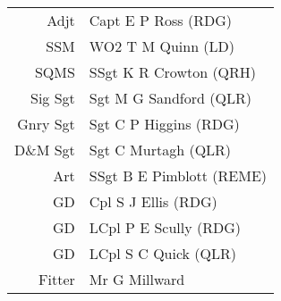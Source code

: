 \begin{center}
  \begin{tabular}{rl}
    Adjt & Capt E P Ross (RDG) \\
    SSM & WO2 T M Quinn (LD) \\
    SQMS & SSgt K R Crowton (QRH) \\
    Sig Sgt & Sgt M G Sandford (QLR) \\
    Gnry Sgt & Sgt C P Higgins (RDG) \\
    D\&M Sgt & Sgt C Murtagh (QLR) \\
    Art & SSgt B E Pimblott (REME) \\
    GD & Cpl S J Ellis (RDG) \\
    GD & LCpl P E Scully (RDG) \\
    GD & LCpl S C Quick (QLR) \\
    Fitter & Mr G Millward \\
  \end{tabular}
\end{center}
